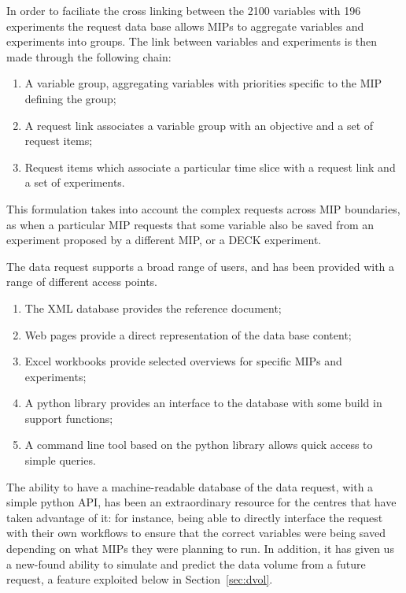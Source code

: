 \documentclass[gmd,manuscript]{copernicus}
\newcommand{\secref}[1] {\mbox{Section  \ref{sec:#1}}}
\begin{document}
In order to faciliate the cross linking between the 2100 variables with 196 experiments the request data base allows MIPs to aggregate variables and experiments into groups. The link between variables and experiments is then made through the following chain:
\begin{enumerate}
  \item A variable group, aggregating variables with priorities specific to the MIP defining the group;
  \item A request link associates a variable group with an objective and a set of request items;
  \item Request items which associate a particular time slice with a request link and a set of experiments.
\end{enumerate}
This formulation
  takes into account the complex requests across MIP boundaries, as
  when a particular MIP requests that some variable also be saved from
  an experiment proposed by a different MIP, or a DECK experiment.

The data request supports a broad range of users, and has been provided with a range of different access points.
\begin{enumerate}
  \item The XML database provides the reference document;
  \item Web pages provide a direct representation of the data base content;
  \item Excel workbooks provide selected overviews for specific MIPs and experiments;
  \item A python library provides an interface to the database with some build in support functions;
  \item A command line tool based on the python library allows quick access to simple queries.
\end{enumerate} 


The ability to have a
  machine-readable database of the data request, with a simple
  python API, has been an extraordinary resource for the centres that
  have taken advantage of it: for instance, being able to directly
  interface the request with their own workflows to ensure that the
  correct variables were being saved depending on what MIPs they were
  planning to run. In addition, it has given us a new-found ability to
  simulate and predict the data volume from a future request, a
  feature exploited below in \secref{dvol}. 
\end{document}

